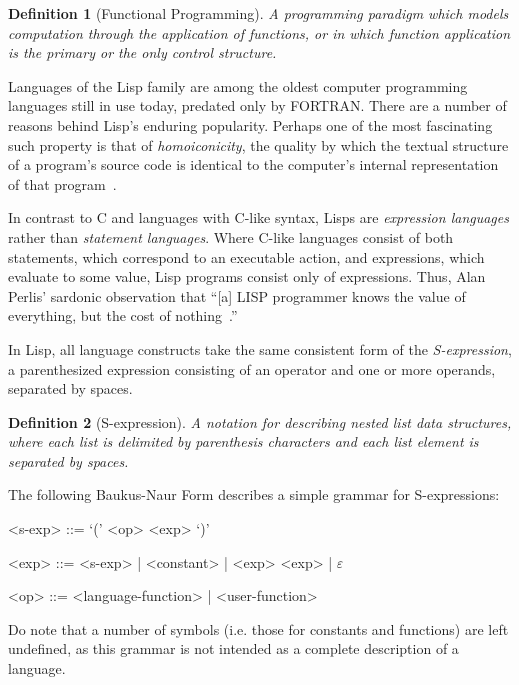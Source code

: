 \documentclass[11pt,draft]{article}
\theoremstyle{break}
\newtheorem{defn}{Definition}
\begin{document}
\begin{defn}[Functional Programming]
A programming paradigm which models computation through the application of functions, or in which function application is the primary or the only control structure.
\end{defn}

Languages of the Lisp family are among the oldest computer programming languages still in use today, predated only by FORTRAN. There are a number of reasons behind Lisp's enduring popularity. Perhaps one of the most fascinating such property is that of \textit{homoiconicity}, the quality by which the textual structure of a program's source code is identical to the computer's internal representation of that program~\cite{vanderhart2010macros,sicp}.

In contrast to C and languages with C-like syntax, Lisps are \textit{expression languages} rather than \textit{statement languages}. Where C-like languages consist of both statements, which correspond to an executable action, and expressions, which evaluate to some value, Lisp programs consist only of expressions. Thus, Alan Perlis' sardonic observation that ``[a] LISP programmer knows the value of everything, but the cost of nothing~\cite{Perlis:1982:SFE:947955.1083808}.''

In Lisp, all language constructs take the same consistent form of the \textit{S-expression}, a parenthesized expression consisting of an operator and one or more operands, separated by spaces.

\begin{defn}[S-expression]
A notation for describing nested list data structures, where each list is delimited by parenthesis characters and each list element is separated by spaces.
\end{defn}

The following Baukus-Naur Form describes a simple grammar for S-expressions:
\begin{listing}[h]
\begin{grammar}
  <s-exp> ::= `(' <op> <exp> `)'

  <exp> ::= <s-exp>  | <constant> | <exp> <exp> | $\varepsilon$

  <op> ::= <language-function> | <user-function>
\end{grammar}
\end{listing}

Do note that a number of symbols (i.e. those for constants and functions) are left undefined, as this grammar is not intended as a complete description of a language.
\end{document}
